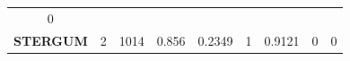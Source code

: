 \begin{longtable}[]{@{}ccccccccc@{}}
\begin{minipage}[t]{0.05\columnwidth}
0\strut
\end{minipage}\tabularnewline
\begin{minipage}[t]{0.13\columnwidth}\centering\strut
\textbf{STERGUM}\strut
\end{minipage} & \begin{minipage}[t]{0.07\columnwidth}\centering\strut
2\strut
\end{minipage} & \begin{minipage}[t]{0.07\columnwidth}\centering\strut
1014\strut
\end{minipage} & \begin{minipage}[t]{0.09\columnwidth}\centering\strut
0.856\strut
\end{minipage} & \begin{minipage}[t]{0.09\columnwidth}\centering\strut
0.2349\strut
\end{minipage} & \begin{minipage}[t]{0.09\columnwidth}\centering\strut
1\strut
\end{minipage} & \begin{minipage}[t]{0.10\columnwidth}\centering\strut
0.9121\strut
\end{minipage} & \begin{minipage}[t]{0.09\columnwidth}\centering\strut
0\strut
\end{minipage} & \begin{minipage}[t]{0.05\columnwidth}\centering\strut
0\strut
\end{minipage}\tabularnewline
\bottomrule
\end{longtable}

